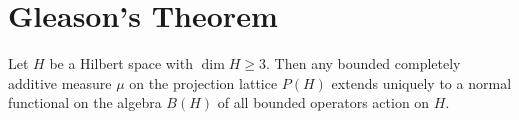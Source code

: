 \chapter{Gleason's Theorem}

\begin{theorem}
    Let \(H\) be a Hilbert space with \(\dim H \ge 3\). Then any bounded completely additive measure \(\mu\) on the projection lattice \(P(H)\) extends uniquely to a normal functional on the algebra \(B(H)\) of all bounded operators action on \(H\).
\end{theorem}

